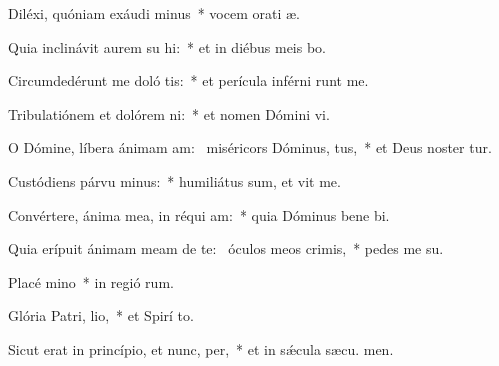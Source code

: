 \item Diléxi, quóniam exáudi minus~* vocem orati æ.
\item Quia inclinávit aurem su hi:~* et in diébus meis bo.
\item Circumdedérunt me doló tis:~* et perícula inférni runt me.
\item Tribulatiónem et dolórem ni:~* et nomen Dómini vi.
\item O Dómine, líbera ánimam am:~\pscross{} miséricors Dóminus,  tus,~* et Deus noster tur.
\item Custódiens párvu minus:~* humiliátus sum, et vit me.
\item Convértere, ánima mea, in réqui am:~* quia Dóminus bene bi.
\item Quia erípuit ánimam meam de te:~\pscross{} óculos meos  crimis,~* pedes me  su.
\item Placé mino~* in regió rum.
\item Glória Patri,  lio,~* et Spirí to.
\item Sicut erat in princípio, et nunc,  per,~* et in sǽcula sæcu. men.
